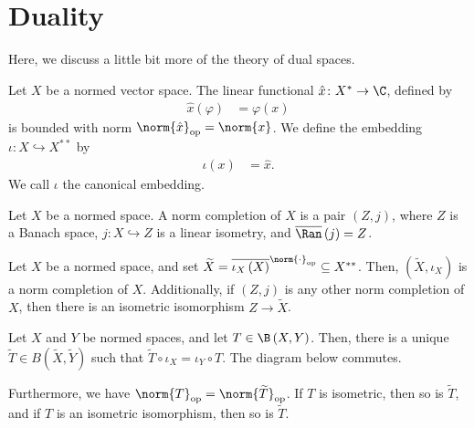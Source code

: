 \section{Duality}%
Here, we discuss a little bit more of the theory of dual spaces.
\begin{definition}
  Let $X$ be a normed vector space. The linear functional $\hat{x}\colon X^{\ast}\rightarrow \C$, defined by
  \begin{align*}
    \hat{x}(\varphi) &= \varphi(x)
  \end{align*}
  is bounded with norm $\norm{\hat{x}}_{\op} = \norm{x}$. We define the embedding $\iota\colon X\hookrightarrow X^{\ast\ast}$ by
  \begin{align*}
    \iota(x) &= \hat{x}.
  \end{align*}
  We call $\iota$ the canonical embedding.
\end{definition}
\begin{definition}
  Let $X$ be a normed space. A norm completion of $X$ is a pair $\left(Z,j\right)$, where $Z$ is a Banach space, $j\colon X\hookrightarrow Z$ is a linear isometry, and $\overline{\Ran}\left(j\right) = Z$.
\end{definition}
\begin{proposition}
  Let $X$ be a normed space, and set $\widetilde{X} = \overline{\iota_X\left(X\right)}^{\norm{\cdot}_{\op}}\subseteq X^{\ast\ast}$. Then, $\left(\widetilde{X},\iota_X\right)$ is a norm completion of $X$. Additionally, if $\left(Z,j\right)$ is any other norm completion of $X$, then there is an isometric isomorphism $Z\rightarrow \widetilde{X}$.
\end{proposition}
\begin{proposition}
  Let $X$ and $Y$ be normed spaces, and let $T\in \B\left(X,Y\right)$. Then, there is a unique $\widetilde{T}\in B\left(\widetilde{X},\widetilde{Y}\right)$ such that $\widetilde{T}\circ \iota_X = \iota_Y\circ T$. The diagram below commutes.
  \begin{center}
  \end{center}
  Furthermore, we have $\norm{T}_{\op} = \norm{\widetilde{T}}_{\op}$. If $T$ is isometric, then so is $\widetilde{T}$, and if $T$ is an isometric isomorphism, then so is $\widetilde{T}$.
\end{proposition}
